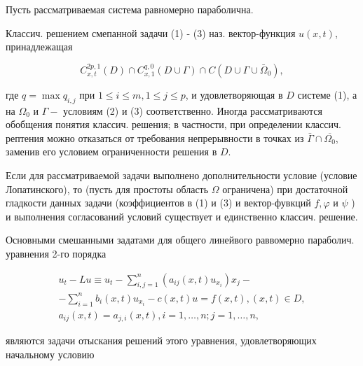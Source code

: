 \documentclass[10pt]{article}
\begin{document}
Пусть рассматриваемая система равномерно параболична.



Классич. решением смепанной задачи (1) - (3) наз. вектор-функция $u(x, t)$, принадлежащая



\[

C_{x, t}^{2 p, 1}(D) \cap C_{x, 1}^{q, 0}(D \cup \Gamma) \cap C\left(D \cup \Gamma \cup \bar{\Omega}_{0}\right),

\]



где $q=\max q_{i, j}$ при $1 \leqslant i \leqslant m, 1 \leqslant j \leqslant p$, и удовлетворяющая в $D$ системе (1), а на $\Omega_{0}$ и $\Gamma-$ условиям (2) и (3) соответственно. Иногда рассматриваются обобщения понятия классич. решения; в частности, при определении классич. рептения можно отказаться от требования непрерывности в точках из $\bar{\Gamma} \cap \overline{\Omega_{0}}$, заменив его условием ограниченности решения в $D$.



Если для рассматриваемой задачи выполнено дополнительности условие (условие Лопатинского), то (пусть для простоты область $\Omega$ ограничена) при достаточной гладкости данных задачи (коэффициентов в (1) и (3) и вектор-фувкций $f, \varphi$ и $\psi$ ) и выполнения согласований условий существует и единственно классич. решение.



Основными смешанными задатами для общего линейвого раввомерно параболич. уравнения 2-го порядка



\[

\begin{gathered}

u_{t}-L u \equiv u_{t}-\sum_{i, j=1}^{n}\left(a_{i j}(x, t) u_{x_{i}}\right) x_{j}- \\

-\sum_{i=1}^{n} b_{i}(x, t) u_{x_{i}}-c(x, t) u=f(x, t),(x, t) \in D, \\

a_{i j}(x, t)=a_{j, i}(x, t), i=1, \ldots, n ; j=1, \ldots, n,

\end{gathered}

\]



являются задачи отыскания решений этого уравнения, удовлетворяющих начальному условию
\end{document}
